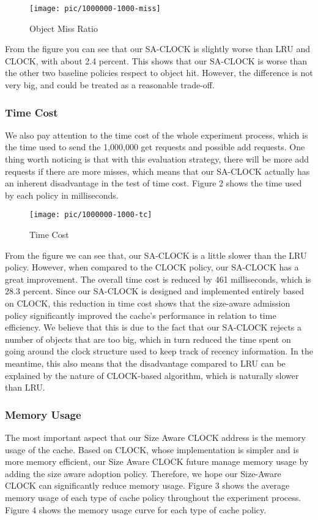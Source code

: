 \documentclass[conference]{IEEEtran}
\begin{document}
\begin{figure}[h]
    \centering
    \texttt{[image: pic/1000000-1000-miss]}
    \caption{Object Miss Ratio}
\end{figure}

From the figure you can see that our SA-CLOCK is slightly worse than LRU and CLOCK, with about 2.4 percent. This shows that our SA-CLOCK is worse than the other two baseline policies respect to object hit. However, the difference is not very big, and could be treated as a reasonable trade-off. 

\subsubsection{Time Cost}
We also pay attention to the time cost of the whole experiment process, which is the time used to send the 1,000,000 get requests and possible add requests. One thing worth noticing is that with this evaluation strategy, there will be more add requests if there are more misses, which means that our SA-CLOCK actually has an inherent disadvantage in the test of time cost. Figure 2 shows the time used by each policy in milliseconds.

\begin{figure}[h]
    \centering
    \texttt{[image: pic/1000000-1000-tc]}
    \caption{Time Cost}
\end{figure}

From the figure we can see that, our SA-CLOCK is a little slower than the LRU policy. However, when compared to the CLOCK policy, our SA-CLOCK has a great improvement. The overall time cost is reduced by 461 milliseconds, which is 28.3 percent. Since our SA-CLOCK is designed and implemented entirely based on CLOCK, this reduction in time cost shows that the size-aware admission policy significantly improved the cache's performance in relation to time efficiency. We believe that this is due to the fact that our SA-CLOCK rejects a number of objects that are too big, which in turn reduced the time spent on going around the clock structure used to keep track of recency information. In the meantime, this also means that the disadvantage compared to LRU can be explained by the nature of CLOCK-based algorithm, which is naturally slower than LRU.


\subsubsection{Memory Usage}
The most important aspect that our Size Aware CLOCK address is the memory usage of the cache. Based on CLOCK, whose implementation is simpler and is more memory efficient, our Size Aware CLOCK future manage memory usage by adding the size aware adoption policy. Therefore, we hope our Size-Aware CLOCK can significantly reduce memory usage. Figure 3 shows the average memory usage of each type of cache policy throughout the experiment process. Figure 4 shows the memory usage curve for each type of cache policy.
\end{document}
